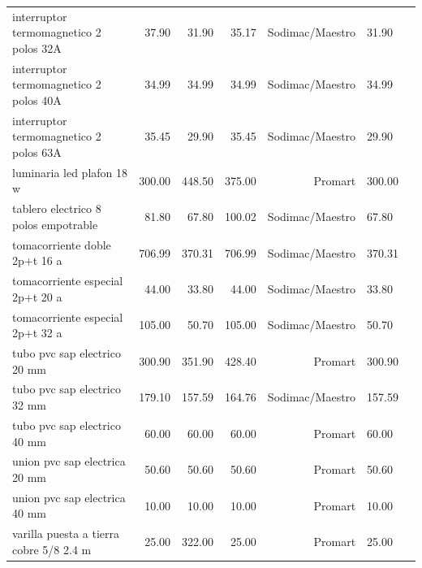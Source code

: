 \begin{landscape}
\begin{longtable}{p{7.2cm}rrrrp{3.0cm}r}
interruptor termomagnetico 2 polos 32A & 37.90 & 31.90 & 35.17 & Sodimac/Maestro & 31.90 \\
interruptor termomagnetico 2 polos 40A & 34.99 & 34.99 & 34.99 & Sodimac/Maestro & 34.99 \\
interruptor termomagnetico 2 polos 63A & 35.45 & 29.90 & 35.45 & Sodimac/Maestro & 29.90 \\
luminaria led plafon 18 w & 300.00 & 448.50 & 375.00 & Promart & 300.00 \\
tablero electrico 8 polos empotrable & 81.80 & 67.80 & 100.02 & Sodimac/Maestro & 67.80 \\
tomacorriente doble 2p+t 16 a & 706.99 & 370.31 & 706.99 & Sodimac/Maestro & 370.31 \\
tomacorriente especial 2p+t 20 a & 44.00 & 33.80 & 44.00 & Sodimac/Maestro & 33.80 \\
tomacorriente especial 2p+t 32 a & 105.00 & 50.70 & 105.00 & Sodimac/Maestro & 50.70 \\
tubo pvc sap electrico 20 mm & 300.90 & 351.90 & 428.40 & Promart & 300.90 \\
tubo pvc sap electrico 32 mm & 179.10 & 157.59 & 164.76 & Sodimac/Maestro & 157.59 \\
tubo pvc sap electrico 40 mm & 60.00 & 60.00 & 60.00 & Promart & 60.00 \\
union pvc sap electrica 20 mm & 50.60 & 50.60 & 50.60 & Promart & 50.60 \\
union pvc sap electrica 40 mm & 10.00 & 10.00 & 10.00 & Promart & 10.00 \\
varilla puesta a tierra cobre 5/8 2.4 m & 25.00 & 322.00 & 25.00 & Promart & 25.00 \\
\bottomrule\end{longtable}\normalsize\end{landscape}
